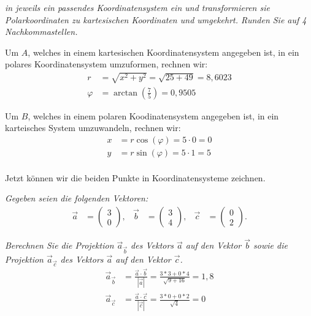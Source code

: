 \documentclass[
  ngerman,
  DIV=14
]{scrartcl}
\begin{document}
\emph{in jeweils ein passendes Koordinatensystem ein und transformieren sie Polarkoordinaten zu kartesischen Koordinaten und umgekehrt. Runden Sie auf 4 Nachkommastellen.}


Um $A$, welches in einem kartesischen Koordinatensystem angegeben ist, in ein polares Koordinatensystem umzuformen, rechnen wir:
\begin{align*}
  r &= \sqrt{x^2 + y^2} = \sqrt{25 + 49} = 8,6023\\
  \varphi &= \arctan(\frac{7}{5}) = 0,9505
\end{align*}

Um $B$, welches in einem polaren Koodinatensystem angegeben ist, in ein karteisches System umzuwandeln, rechnen wir:
\begin{align*}
  x &= r \cos(\varphi) = 5 \cdot 0 = 0\\
  y &= r \sin(\varphi) = 5 \cdot 1 = 5\\
\end{align*}

Jetzt können wir die beiden Punkte in Koordinatensysteme zeichnen.




\emph{Gegeben seien die folgenden Vektoren:}
\begin{align*}
\vec{a} &= \begin{pmatrix}3\\0\end{pmatrix}, & \vec{b} &= \begin{pmatrix}3\\4\end{pmatrix}, & \vec{c} &= \begin{pmatrix}0\\2\end{pmatrix}.
\end{align*}


\emph{Berechnen Sie die Projektion $\vec{a}_{\vec{b}}$ des Vektors $\vec{a}$ auf den Vektor $\vec{b}$ sowie die Projektion $\vec{a}_{\vec{c}}$ des Vektors $\vec{a}$ auf den Vektor $\vec{c}$.}
\begin{align*}
\vec{a}_{\vec{b}} &= \frac{\vec{a} \cdot \vec{b}}{|\vec{a}|} = \frac{3*3+0*4}{\sqrt{9+16}}=1,8\\
\vec{a}_{\vec{c}} &= \frac{\vec{a} \cdot \vec{c}}{|\vec{c}|}=\frac{3 * 0 + 0 * 2}{\sqrt{4}} = 0
\end{align*}
\end{document}
